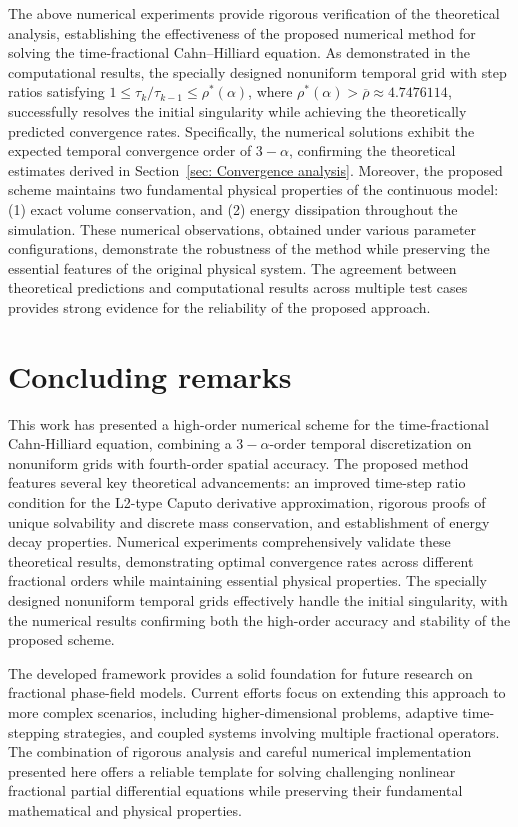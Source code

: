 \documentclass{siamart171218}
\theoremstyle{remark}
\theoremstyle{example}
\numberwithin{equation}{section}
\begin{document}
The above numerical experiments provide rigorous verification of the theoretical analysis, establishing the effectiveness of the proposed numerical method for solving the time-fractional Cahn--Hilliard equation. As demonstrated in the computational results, the specially designed nonuniform temporal grid with step ratios satisfying $1 \leq \tau_k/\tau_{k-1} \leq \rho^*(\alpha)$, where $\rho^*(\alpha) > \overline{\rho} \approx 4.7476114$, successfully resolves the initial singularity while achieving the theoretically predicted convergence rates. Specifically, the numerical solutions exhibit the expected temporal convergence order of $3-\alpha$, confirming the theoretical estimates derived in Section~\ref{sec: Convergence analysis}.
Moreover, the proposed scheme maintains two fundamental physical properties of the continuous model: (1) exact volume conservation, and (2) energy dissipation throughout the simulation. These numerical observations, obtained under various parameter configurations, demonstrate the robustness of the method while preserving the essential features of the original physical system. The agreement between theoretical predictions and computational results across multiple test cases provides strong evidence for the reliability of the proposed approach.


\section{Concluding remarks}\label{sec: Concluding remarks}

This work has presented a high-order numerical scheme for the time-fractional Cahn-Hilliard equation, combining a $3-\alpha$-order temporal discretization on nonuniform grids with fourth-order spatial accuracy. The proposed method features several key theoretical advancements: an improved time-step ratio condition for the L2-type Caputo derivative approximation, rigorous proofs of unique solvability and discrete mass conservation, and establishment of energy decay properties. Numerical experiments comprehensively validate these theoretical results, demonstrating optimal convergence rates across different fractional orders while maintaining essential physical properties. The specially designed nonuniform temporal grids effectively handle the initial singularity, with the numerical results confirming both the high-order accuracy and stability of the proposed scheme.

The developed framework provides a solid foundation for future research on fractional phase-field models. Current efforts focus on extending this approach to more complex scenarios, including higher-dimensional problems, adaptive time-stepping strategies, and coupled systems involving multiple fractional operators. The combination of rigorous analysis and careful numerical implementation presented here offers a reliable template for solving challenging nonlinear fractional partial differential equations while preserving their fundamental mathematical and physical properties.
\end{document}
